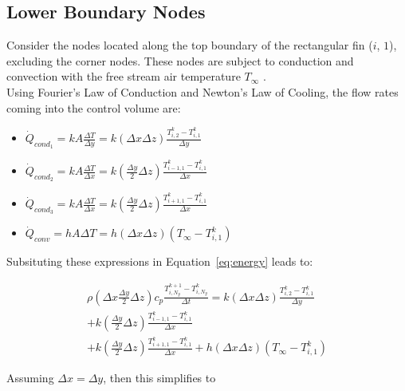 \documentclass{article}
\newcommand{\ddfrac}[2]{\frac{\displaystyle #1}{\displaystyle #2}}
\begin{document}
\subsection{Lower Boundary Nodes}
Consider the nodes located along the top boundary of the rectangular fin ($i$, $1$), excluding the corner nodes. These nodes are subject to conduction and convection with the free stream air temperature $T_{\infty}$ .\\

Using Fourier's Law of Conduction and Newton's Law of Cooling, the flow rates coming into the control volume are:

\begin{itemize}
    \item $\dot{Q}_{cond_{1}} = kA\ddfrac{\Delta T}{\Delta y} = k(\Delta x \Delta z) \ddfrac{T_{i,2}^k - T_{i,1}^k}{\Delta y}$
    \item $\dot{Q}_{cond_{2}} = kA\ddfrac{\Delta T}{\Delta x} = k(\ddfrac{\Delta y}{2} \Delta z) \ddfrac{T_{i-1,1}^k - T_{i,1}^k}{\Delta x}$
    \item $\dot{Q}_{cond_{3}} = kA\ddfrac{\Delta T}{\Delta x} = k(\ddfrac{\Delta y}{2} \Delta z) \ddfrac{T_{i+1,1}^k - T_{i,1}^k}{\Delta x}$
    \item $\dot{Q}_{conv} = hA\Delta T = h(\Delta x \Delta z)\left(T_{\infty} - T_{i,1}^k\right)$
\end{itemize}

Subsituting these expressions in Equation~\eqref{eq:energy} leads to:

\begin{multline*}
    \rho\left(\Delta x \ddfrac{\Delta y}{2} \Delta z\right) c_p \ddfrac{T_{i,N_y}^{k+1} - T_{i,N_y}^k}{\Delta t} = k(\Delta x \Delta z) \ddfrac{T_{i,2}^k - T_{i,1}^k}{\Delta y} \\
    + k(\ddfrac{\Delta y}{2} \Delta z) \ddfrac{T_{i-1,1}^k - T_{i,1}^k}{\Delta x} \\
    + k(\ddfrac{\Delta y}{2} \Delta z) \ddfrac{T_{i+1,1}^k - T_{i,1}^k}{\Delta x}
    + h(\Delta x \Delta z)\left(T_{\infty} - T_{i,1}^k\right)
\end{multline*}

Assuming $\Delta x = \Delta y$, then this simplifies to 
\begin{center}
    \noindent {}        
\end{center}
\end{document}
